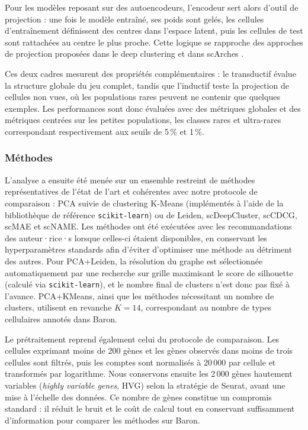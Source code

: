 Pour les modèles reposant sur des autoencodeurs, l'encodeur sert alors d'outil de projection : une fois le modèle entraîné, ses poids sont gelés, les cellules d'entraînement définissent des centres dans l'espace latent, puis les cellules de test sont rattachées au centre le plus proche. Cette logique se rapproche des approches de projection proposées dans le deep clustering \cite{xie2016unsupervised,guo2017improved} et dans scArches \cite{lotfollahi2021query}.


Ces deux cadres mesurent des propriétés complémentaires : le transductif évalue la structure globale du jeu complet, tandis que l'inductif teste la projection de cellules non vues, où les populations rares peuvent ne contenir que quelques exemples. Les performances sont donc évaluées avec des métriques globales et des métriques centrées sur les petites populations, les classes rares et ultra-rares correspondant respectivement aux seuils de 5\,\% et 1\,\%.

\subsubsection{Méthodes}

L'analyse a ensuite été menée sur un ensemble restreint de méthodes représentatives de l'état de l'art et cohérentes avec notre protocole de comparaison : PCA suivie de clustering K-Means (implémentés à l'aide de la bibliothèque de référence \texttt{scikit-learn}) ou de Leiden, scDeepCluster, scCDCG, scMAE et scNAME. Les méthodes ont été exécutées avec les recommandations des auteur·rice·s lorsque celles-ci étaient disponibles, en conservant les hyperparamètres standards afin d'éviter d'optimiser une méthode au détriment des autres. Pour PCA+Leiden, la résolution du graphe est sélectionnée automatiquement par une recherche sur grille maximisant le score de silhouette (calculé via \texttt{scikit-learn}), et le nombre final de clusters n'est donc pas fixé à l'avance. PCA+KMeans, ainsi que les méthodes nécessitant un nombre de clusters, utilisent en revanche \(K=14\), correspondant au nombre de types cellulaires annotés dans Baron.

Le prétraitement reprend également celui du protocole de comparaison. Les cellules exprimant moins de 200 gènes et les gènes observés dans moins de trois cellules sont filtrés, puis les comptes sont normalisés à 20\,000 par cellule et transformés par logarithme. Nous conservons ensuite les 2\,000 gènes hautement variables (\textit{highly variable genes}, HVG) selon la stratégie de Seurat, avant une mise à l'échelle des données. Ce nombre de gènes constitue un compromis standard : il réduit le bruit et le coût de calcul tout en conservant suffisamment d'information pour comparer les méthodes sur Baron.

